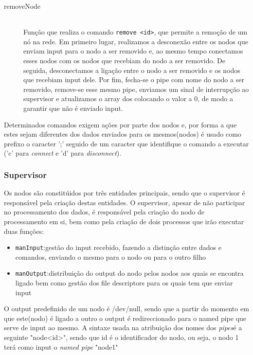 \documentclass[12pt]{article}
\begin{document}
\begin{description}
\item[removeNode] \hfill \\
    Função que realiza o comando \texttt{remove <id>}, que permite a remoção de um nó na rede. Em primeiro lugar, realizamos a desconexão entre os nodos que enviam input para o nodo a ser removido e, ao mesmo tempo conectamos esses nodos com os nodos que recebiam do nodo a ser removido. De seguida, desconectamos a ligação entre o nodo a ser removido e os nodos que recebiam input dele. Por fim, fecha-se o pipe com nome do nodo a ser removido, remove-se esse mesmo pipe, enviamos um sinal de interrupção ao supervisor e atualizamos o array dos  colocando o valor a 0, de modo a garantir que não é enviado input.
\end{description}

Determinados comandos exigem ações por parte dos nodos e, por forma a que estes sejam diferentes dos dados enviados para os mesmos(nodos) é usado como prefixo o caracter ';' seguido de um caracter que identifique o comando a executar ('c' para \textit{connect} e 'd' para \textit{disconnect}).

\subsubsection{Supervisor}
Os nodos são constitúidos por três entidades principais, sendo que o supervisor é responsável pela criação destas entidades.
O supervisor, apesar de não participar no processamento dos dados, é responsável pela criação do nodo de processamento em si, bem como pela criação de dois processos que irão executar duas funções: 
\begin{itemize}
\item \texttt{manInput}:gestão do input recebido, fazendo a distinção entre dados e comandos, enviando o mesmo para o nodo ou para o outro filho
\item \texttt{manOutput}:distribuição do output do nodo pelos nodos aos quais se encontra ligado bem como gestão dos file descriptors para os quais tem que enviar input
\end{itemize}
O output predefinido de um nodo é /dev/null, sendo que a partir do momento em que este(nodo) é ligado a outro o output é redireccionado para o named pipe que serve de input ao mesmo. A sintaxe usada na atribuição dos nomes dos \textit{pipes}é a seguinte "node<id>", sendo que id é o identificador do nodo, ou seja, o nodo 1 terá como input o \textit{named pipe} "node1"
\end{document}
